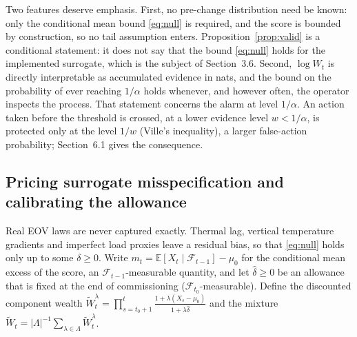 \documentclass[12pt,a4paper]{article}
\newcommand{\rev}[1]{#1}
\newcommand{\rev}[1]{{\color{revcol}#1}}
\newcommand{\rtwo}[1]{#1}
\newcommand{\rtwo}[1]{{\color{revcolb}#1}}
\newcommand{\E}{\mathbb{E}}
\newcommand{\F}{\mathcal{F}}
\begin{document}
Two features deserve emphasis. First, no pre-change distribution need be known: only the conditional mean bound \eqref{eq:null} is required, and the score is bounded by construction, so no tail assumption enters. \rtwo{\rtwo{Proposition~\ref{prop:valid} is a conditional statement: it does not say that the bound \eqref{eq:null} holds for the implemented surrogate, which is the subject of Section~3.6.} Second, $\log W_t$ is directly interpretable as accumulated evidence in nats, and the bound on the probability of ever reaching $1/\alpha$ holds whenever, and however often, the operator inspects the process.} \color{revcolb}\rev{That statement concerns the alarm at level $1/\alpha$.\color{revcol} \color{revcolb}An action taken before the threshold is crossed, at a lower evidence level $w<1/\alpha$, is protected only at the level $1/w$ (Ville's inequality), a larger false-action probability; Section~6.1 gives the consequence.}\color{black}

\subsection{Pricing surrogate misspecification and calibrating the allowance}\label{sec:calib}

Real EOV laws are never captured exactly. Thermal lag, vertical temperature gradients and imperfect load proxies leave a residual bias, so that \eqref{eq:null} holds only up to some $\delta\ge0$. \rev{Write $m_t=\E[X_t\mid\F_{t-1}]-\mu_0$ for the conditional mean excess of the score, an $\F_{t-1}$-measurable quantity, and let $\hat\delta\ge0$ be an allowance that is fixed at the end of commissioning ($\F_{t_0}$-measurable). Define the discounted component wealth $\widetilde W^\lambda_t=\prod_{s=t_0+1}^{t}\frac{1+\lambda(X_s-\mu_0)}{1+\lambda\hat\delta}$ and the mixture $\widetilde W_t=|\Lambda|^{-1}\sum_{\lambda\in\Lambda}\widetilde W^\lambda_t$.}
\end{document}
